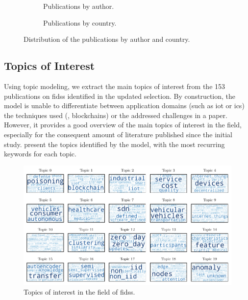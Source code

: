 \begin{figure}
  \centering
  \begin{subfigure}{0.48\textwidth}
    \centering
    
    \caption{
      Publications by author.
      \label{fig:sota.authors}
    }
  \end{subfigure}
  \hfill
  \begin{subfigure}{0.48\textwidth}
    \centering
    
    \caption{
      Publications by country.
      \label{fig:sota.countries}
    }
  \end{subfigure}
  \caption{
    Distribution of the publications by author and country.
    \label{fig:sota.authors-countries}
  }
\end{figure}


\subsection{Topics of Interest\label{sec:sota.quanti.topics}}

Using topic modeling, we extract the main topics of interest from the 153 publications on \glspl{fids} identified in the updated selection.
By construction, the model is unable to differentiate between application domains (such as \gls{iot} or \gls{ics}) the techniques used (\eg, blockchains) or the addressed challenges in a paper.
However, it provides a good overview of the main topics of interest in the field, especially for the consequent amount of literature published since the initial study.
 present the topics identified by the model, with the most recurring keywords for each topic.


\begin{figure}
  \centering
  \includegraphics[width=\textwidth]{figures/topic_clouds.pdf}
  \caption{
    Topics of interest in the field of \glspl{fids}.
    \label{fig:sota.topics}
  }
\end{figure}


